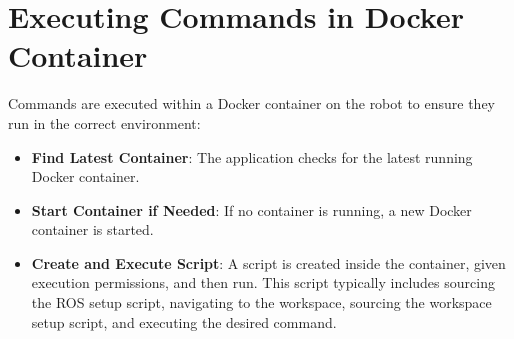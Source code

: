 \section{Executing Commands in Docker Container}
Commands are executed within a Docker container on the robot to ensure they run in the correct environment:
\begin{itemize}
	\item \textbf{Find Latest Container}: The application checks for the latest running Docker container.
	\item \textbf{Start Container if Needed}: If no container is running, a new Docker container is started.
	\item \textbf{Create and Execute Script}: A script is created inside the container, given execution permissions, and then run. This script typically includes sourcing the ROS setup script, navigating to the workspace, sourcing the workspace setup script, and executing the desired command.
\end{itemize}
